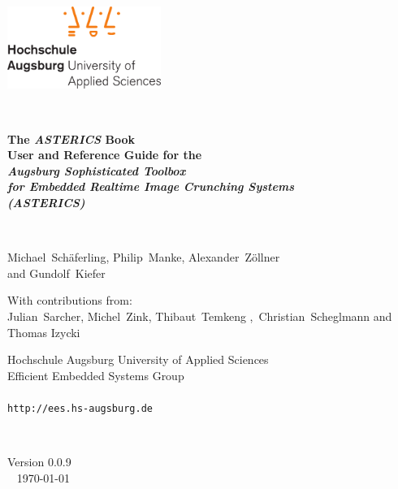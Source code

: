 \documentclass[12pt,english]{scrreprt}
\newcommand{\asterics}{\textit{ASTERICS}\xspace}
\begin{document}

\sloppy

\begin{titlepage}

\begin{flushright}
\includegraphics[width=5cm]{figs/hsa_logo}
\par\end{flushright}

\begin{center}
\vfill ~ \vfill

\textsf{\textbf{\Huge The \asterics Book}}
\vspace{1.5em}  \\
\textsf{\textbf{\Large User and Reference Guide for the\\
\textit{Augsburg Sophisticated Toolbox\\ for Embedded Realtime Image Crunching Systems\\ \vspace{0.2em} (ASTERICS)}}}

\vfill ~ \vfill

\textsf{\Large{}
Michael~Schäferling, 
Philip~Manke, Alexander~Zöllner 
\ifdefined\astericsinternal
~
\fi
\medskip
\\and Gundolf~Kiefer
}

\vfill

\textsf{\Large{}
    With contributions from:\\ \medskip
    Julian~Sarcher, Michel~Zink, Thibaut~Temkeng
    \ifdefined\astericsinternal
    ,~Christian~Scheglmann
    \fi
    and Thomas Izycki
}

\vfill

\textsf{\Large
Hochschule Augsburg \textendash{} University of Applied Sciences \\
Efficient Embedded Systems Group \\
\medskip ~ \\
\texttt{http://ees.hs-augsburg.de}
}

\vfill ~ \vfill

\textsf{
  \Large{Version 0.0.9} \\ \medskip ~
  \Large{\today}
}

\vfill ~ \vfill



\end{center}
\end{titlepage}
\end{document}
